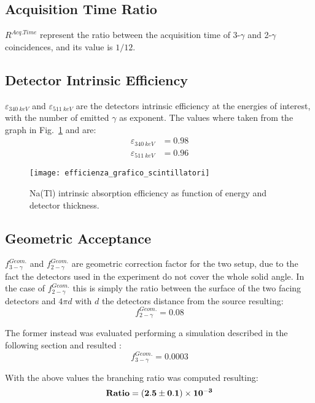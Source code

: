 \subsection*{Acquisition Time Ratio}
$R^{Acq.Time}$ represent the ratio between the acquisition time of 3-$\gamma$ and 2-$\gamma$ coincidences, and its value is $1/12$.

\subsection*{Detector Intrinsic Efficiency}
$\varepsilon_{340~keV}$ and $\varepsilon_{511~keV}$ are the detectors intrinsic efficiency at the energies of interest,  with the number of emitted $\gamma$ as exponent. The values where taken from the graph in Fig.~\ref{Fig:Efficiency} and are: 
\begin{equation*}
\begin{split}
\varepsilon_{340~keV} & =0.98 \\
\varepsilon_{511~keV}  & =0.96
\end{split}
\end{equation*} 

\begin{figure}[H]
\centering
\texttt{[image: efficienza\_grafico\_scintillatori]}
\caption{Na(Tl) intrinsic absorption efficiency as function of energy and detector thickness.}
\label{Fig:Efficiency}
\end{figure} 

\subsection*{Geometric Acceptance}
$f_{3-\gamma}^{Geom.}$ and $f_{2-\gamma}^{Geom.}$ are geometric correction factor for the two setup, due to the fact the detectors used in the experiment do not cover the whole solid angle. In the case of $f_{2-\gamma}^{Geom.}$ this is simply the ratio between the surface of the two facing detectors and $4 \pi d$ with $d$ the detectors distance from the source resulting: 
\begin{equation*}
f_{2-\gamma}^{Geom.}=0.08
\end{equation*}

 The former instead was evaluated performing a simulation described in the following section and resulted :
\begin{equation*}
f_{3-\gamma}^{Geom.}=0.0003
\end{equation*}

With the above values the branching ratio was computed resulting:
\begin{equation*}
\mathbf{ \text{\textbf{Ratio}}=(2.5\pm0.1)\times 10^{-3} }
\end{equation*}




